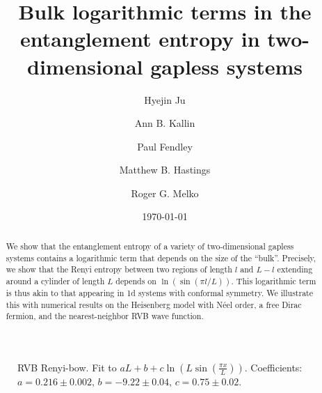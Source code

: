 \documentclass[prl,aps,twocolumn,floatfix,amsmath,amssymb,superscriptaddress,tightenlines]{revtex4}
\begin{document}
\date{\today}
\title{Bulk logarithmic terms in the entanglement entropy in
  two-dimensional gapless systems}

\author{Hyejin Ju}

\author{Ann B. Kallin}

\author{Paul Fendley}

\author{Matthew B. Hastings}

\author{Roger G. Melko}

\begin{abstract} 
We show that the entanglement entropy of a variety of two-dimensional
gapless systems contains a logarithmic term that depends on the size
of the ``bulk''. Precisely, we show that the Renyi entropy between two
regions of length $l$ and $L-l$ extending around a cylinder of length
$L$ depends on $\ln(\sin(\pi l/L))$. This logarithmic term is thus
akin to that appearing in 1d systems with conformal symmetry. We
illustrate this with numerical results on the Heisenberg model with
N\'eel order, a free Dirac fermion, and the nearest-neighbor RVB wave
function.


 
\end{abstract}
\maketitle


\begin{figure}[h]
  \begin{center}
  \end{center}
  \caption{RVB Renyi-bow. Fit to $a L + b + c \ln \left( L \sin \left( \frac{\pi
 x}{L} \right) \right).$ Coefficients: $a = 0.216\pm 0.002, \, b = -9.22 \pm 0.0
4, \, c = 0.75\pm 0.02$.}
  \label{fig:1}
\end{figure}
\end{document}
